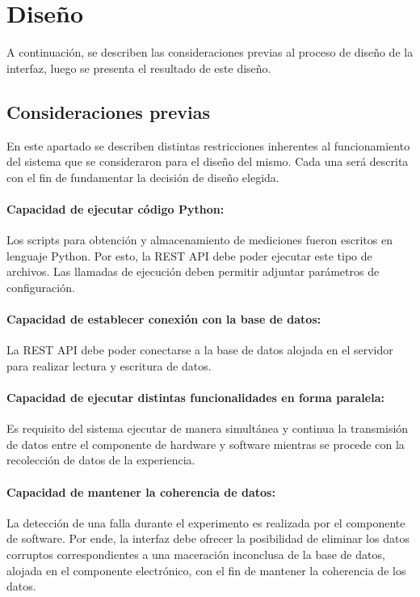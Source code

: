     \section{Diseño}
    A continuación, se describen las consideraciones previas al proceso de diseño de la interfaz, luego se presenta el resultado de este diseño.
        
        \subsection{Consideraciones previas}
            \par En este apartado se describen distintas restricciones inherentes al funcionamiento del sistema que se consideraron para el diseño del mismo. Cada una será descrita con el fin de fundamentar la decisión de diseño elegida.

            \paragraph{Capacidad de ejecutar código Python:}
                \par Los scripts para obtención y almacenamiento de mediciones fueron escritos en lenguaje Python. Por esto, la REST API  debe poder ejecutar este tipo de archivos. Las llamadas de ejecución deben permitir adjuntar parámetros de configuración.
        
            \paragraph{Capacidad de establecer conexión con la base de datos:} 
                \par La REST API debe poder conectarse a la base de datos alojada en el servidor para realizar lectura y escritura de datos.
       
            \paragraph{Capacidad de ejecutar distintas funcionalidades en forma paralela:}
                \par Es requisito del sistema ejecutar de manera simultánea y continua la transmisión de datos entre el componente de hardware y software mientras se procede con la recolección de datos de la experiencia.
            
            \paragraph{Capacidad de mantener la coherencia de datos:}
                \par La detección de una falla durante el experimento es realizada por el componente de software. Por ende, la interfaz debe ofrecer la posibilidad de eliminar los datos corruptos correspondientes a una maceración inconclusa de la base de datos, alojada en el componente electrónico, con el fin de mantener la coherencia de los datos.
            
